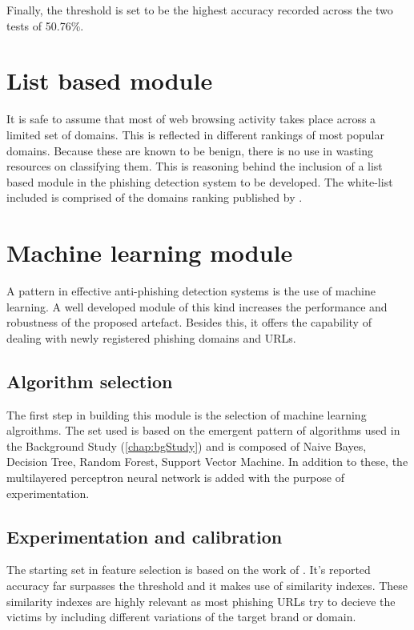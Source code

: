 Finally, the threshold is set to be the highest accuracy recorded across the two tests of 50.76\%.

\section{List based module}

It is safe to assume that most of web browsing activity takes place across a limited set of domains. This is reflected in different rankings of most popular domains. Because these are known to be benign, there is no use in wasting resources on classifying them. This is reasoning behind the inclusion of a list based module in the phishing detection system to be developed.
The white-list included is comprised of the domains ranking published by \cite{MAJESTIC_MILLION}.

\section{Machine learning module}
A pattern in effective anti-phishing detection systems is the use of machine learning. A well developed module of this kind increases the performance and robustness of the proposed artefact. Besides this, it offers the capability of dealing with newly registered phishing domains and URLs.

\subsection{Algorithm selection}
The first step in building this module is the selection of machine learning algroithms. The set used is based on the emergent pattern of algorithms used in the Background Study (\ref{chap:bgStudy}) and is composed of Naive Bayes, Decision Tree, Random Forest, Support Vector Machine. In addition to these, the multilayered perceptron neural network is added with the purpose of experimentation.

\subsection{Experimentation and calibration}
The starting set in feature selection is based on the work of \cite{SVM_SIMILARITY_INDEX}. It's reported accuracy far surpasses the threshold and it makes use of similarity indexes. These similarity indexes are highly relevant as most phishing URLs try to decieve the victims by including different variations of the target brand or domain.

